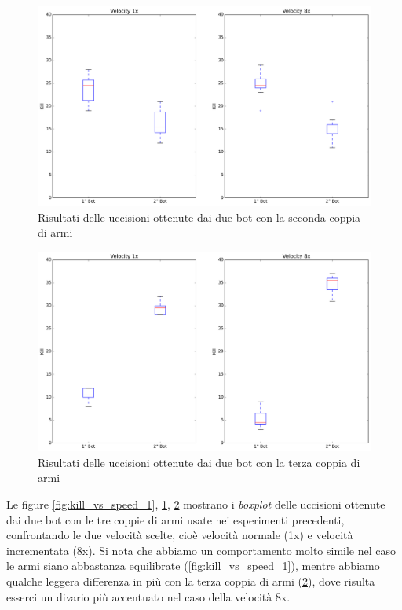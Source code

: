 \documentclass[12pt, italian]{toptesi}
\begin{document}
\begin{figure}[htp]
\centering
\includegraphics[width=1.0\textwidth]{1vs8_2}
\caption{Risultati delle uccisioni ottenute dai due bot con la seconda coppia di armi}
\label{fig:kill_vs_speed_2}
\end{figure}

\begin{figure}[htp]
\centering
\includegraphics[width=1.0\textwidth]{1vs8_3}
\caption{Risultati delle uccisioni ottenute dai due bot con la terza coppia di armi}
\label{fig:kill_vs_speed_3}
\end{figure}

Le figure \ref{fig:kill_vs_speed_1}, \ref{fig:kill_vs_speed_2}, \ref{fig:kill_vs_speed_3} mostrano i \emph{boxplot} delle uccisioni ottenute dai due bot con le tre coppie di armi usate nei esperimenti precedenti, confrontando le due velocità scelte, cioè velocità normale (1x) e velocità incrementata (8x).
Si nota che abbiamo un comportamento molto simile nel caso le armi siano abbastanza equilibrate (\ref{fig:kill_vs_speed_1}), mentre abbiamo qualche leggera differenza in più con la terza coppia di armi (\ref{fig:kill_vs_speed_3}), dove risulta esserci un divario più accentuato nel caso della velocità 8x.
\end{document}
